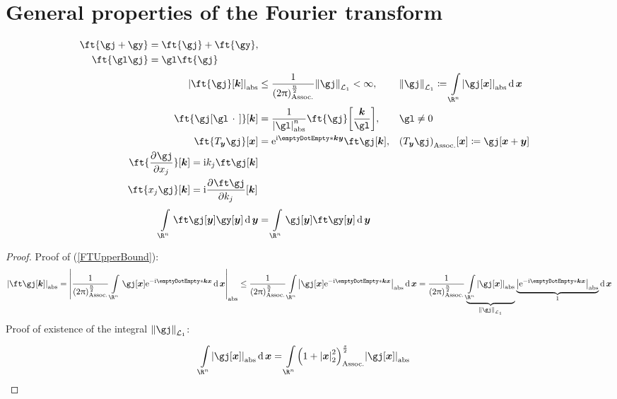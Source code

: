 \documentclass[10pt]{article}
\newcommand{\Rn}{{\R^n}}
\newcommand{\ftnrm}{\frac{1}{\pa{2\Pi}^\frac{n}{2}} }
\begin{document}
  \section{General properties of the Fourier transform}
  \begin{lemma}
    \begin{align}
      \label{FTLinearity}
      \begin{split}      
      \ft{\gj + \gy} &= \ft{\gj} + \ft{\gy},\\
      \ft{\gl \gj} &= \gl \ft{\gj} 
      \end{split}
      \\
      \label{FTUpperBound}
      \abs{\ft{\gj}\of\vk} &\leq \ftnrm\Lnorm[1]{\gj}<\infty, &&
      \Lnorm[1]{\gj} \DefineAs \int\Rn \abs{\gj\of\vx} \diffd \vx
      \\
      \label{FTScaling}
      \ft{\gj\of{\gl\placeholder}}\of\vk &= \frac{1}{\abs{\gl}^n}\ft{\gj}\of{\frac\vk\gl}, &&
      \gl\neq 0
      \\
      \label{FTTranslation}
      \ft{T_\vy\gj}\of\vx &= \E^{\I\scal\vk\vy}\ft\gj\of\vk, &&
      \pa{T_\vy\gj}\of\vx \DefineAs \gj\of{\vx+\vy}
      \\
      \label{FTDerivative}
      \begin{split}
      \ft{\pderiv{x_j}\gj}\of\vk &= \I k_j \ft\gj\of\vk \\ 
      \ft{x_j \gj}\of\vk &= \I \pderiv{k_j}{\ft\gj} \of\vk
      \end{split}
      \\
      \label{FTUnitary}
      \int\Rn\ft\gj\of\vy \gy\of\vy \diffd\vy &= \int\Rn \gj\of\vy \ft\gy\of\vy \diffd\vy
    \end{align}
    \begin{proof}
      Proof of (\ref{FTUpperBound}):
      \begin{equation*}
       \abs{\ft\gj\of\vk} 
        = \abs{\ftnrm\int\Rn \gj\of\vx \E^{-\I \scal\vk\vx}\diffd\vx} 
        \leq \ftnrm\int\Rn \abs{\gj\of\vx 
        \E^{-\I \scal\vk\vx}}\diffd\vx  = \ftnrm
        \underbrace{\int\Rn \abs{\gj\of\vx}}_{\Lnorm[1]{\gj}}
        \underbrace{\abs{\E^{-\I\scal\vk\vx}}}_{1}\diffd\vx \\
      \end{equation*}
      Proof of existence of the integral $\Lnorm[1]\gj$:
      \begin{align*}
        \int\Rn\abs{\gj\of\vx}\diffd\vx 
        &= \int\Rn\pa{1+\norm{\vx}^2}^\frac{s}{2}\abs{\gj\of\vx}

\end{align*}
\end{proof}
\end{lemma}
\end{document}
